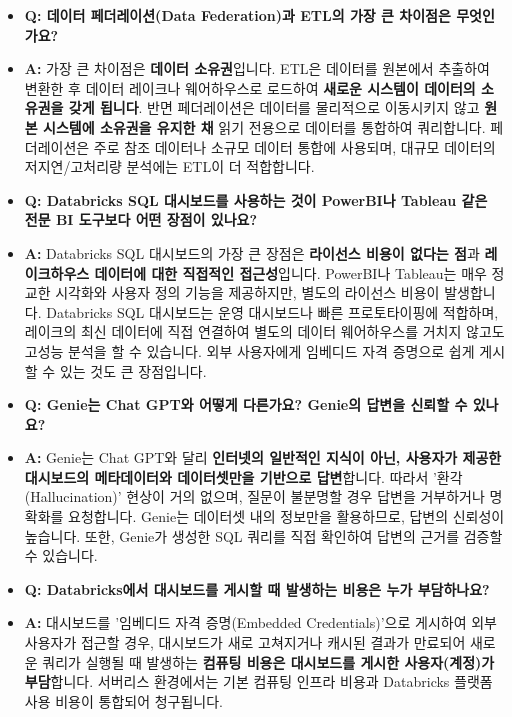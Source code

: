 \documentclass[11pt,a4paper]{article}
\theoremstyle{definition}
\begin{document}
\begin{summarybox}[title=FAQ: 궁금증 해소]
\begin{itemize}
    \item \textbf{Q: 데이터 페더레이션(Data Federation)과 ETL의 가장 큰 차이점은 무엇인가요?}
    \item \textbf{A:} 가장 큰 차이점은 \textbf{데이터 소유권}입니다. ETL은 데이터를 원본에서 추출하여 변환한 후 데이터 레이크나 웨어하우스로 로드하여 \textbf{새로운 시스템이 데이터의 소유권을 갖게 됩니다}. 반면 페더레이션은 데이터를 물리적으로 이동시키지 않고 \textbf{원본 시스템에 소유권을 유지한 채} 읽기 전용으로 데이터를 통합하여 쿼리합니다. 페더레이션은 주로 참조 데이터나 소규모 데이터 통합에 사용되며, 대규모 데이터의 저지연/고처리량 분석에는 ETL이 더 적합합니다.

    \item \textbf{Q: Databricks SQL 대시보드를 사용하는 것이 PowerBI나 Tableau 같은 전문 BI 도구보다 어떤 장점이 있나요?}
    \item \textbf{A:} Databricks SQL 대시보드의 가장 큰 장점은 \textbf{라이선스 비용이 없다는 점}과 \textbf{레이크하우스 데이터에 대한 직접적인 접근성}입니다. PowerBI나 Tableau는 매우 정교한 시각화와 사용자 정의 기능을 제공하지만, 별도의 라이선스 비용이 발생합니다. Databricks SQL 대시보드는 운영 대시보드나 빠른 프로토타이핑에 적합하며, 레이크의 최신 데이터에 직접 연결하여 별도의 데이터 웨어하우스를 거치지 않고도 고성능 분석을 할 수 있습니다. 외부 사용자에게 임베디드 자격 증명으로 쉽게 게시할 수 있는 것도 큰 장점입니다.

    \item \textbf{Q: Genie는 Chat GPT와 어떻게 다른가요? Genie의 답변을 신뢰할 수 있나요?}
    \item \textbf{A:} Genie는 Chat GPT와 달리 \textbf{인터넷의 일반적인 지식이 아닌, 사용자가 제공한 대시보드의 메타데이터와 데이터셋만을 기반으로 답변}합니다. 따라서 '환각(Hallucination)' 현상이 거의 없으며, 질문이 불분명할 경우 답변을 거부하거나 명확화를 요청합니다. Genie는 데이터셋 내의 정보만을 활용하므로, 답변의 신뢰성이 높습니다. 또한, Genie가 생성한 SQL 쿼리를 직접 확인하여 답변의 근거를 검증할 수 있습니다.

    \item \textbf{Q: Databricks에서 대시보드를 게시할 때 발생하는 비용은 누가 부담하나요?}
    \item \textbf{A:} 대시보드를 '임베디드 자격 증명(Embedded Credentials)'으로 게시하여 외부 사용자가 접근할 경우, 대시보드가 새로 고쳐지거나 캐시된 결과가 만료되어 새로운 쿼리가 실행될 때 발생하는 \textbf{컴퓨팅 비용은 대시보드를 게시한 사용자(계정)가 부담}합니다. 서버리스 환경에서는 기본 컴퓨팅 인프라 비용과 Databricks 플랫폼 사용 비용이 통합되어 청구됩니다.


\end{itemize}
\end{summarybox}
\end{document}
